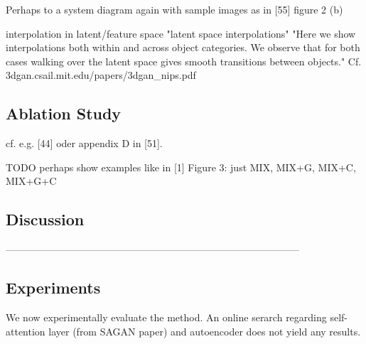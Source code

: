 \documentclass[12pt,a4paper]{article}
\begin{document}
\par Perhaps to a system diagram again with sample images as in [55] figure 2 (b)

interpolation in latent/feature space
"latent space interpolations"
"Here we show interpolations both within and across object categories. We observe that for both cases walking over the latent space gives smooth transitions between objects." Cf. 3dgan.csail.mit.edu/papers/3dgan\_nips.pdf
 
\subsection{Ablation Study}
cf. e.g. [44] oder appendix D in [51].

TODO perhaps show examples like in [1] Figure 3: just MIX, MIX+G, MIX+C, MIX+G+C

\subsection{Discussion}


-----------------------------------------------------------------------------------------
\newline

\subsection{Experiments}
We now experimentally evaluate the method. An online serarch regarding self-attention layer (from SAGAN paper) and autoencoder does not yield any results.
\end{document}
